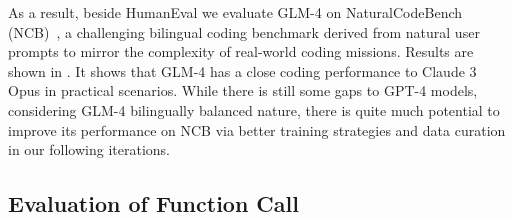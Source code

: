 \begin{table}[!ht]
    \centering
    \renewcommand{\arraystretch}{1.5}
    \caption{GLM-4 performance on NaturalCodeBench (NCB)~\cite{zhang2024naturalcodebench}, a benchmark with real coding prompts in two programming languages (Python and Java) for English and Chinese.}
    \label{tab:ncb}
\end{table}



As a result, beside HumanEval we evaluate GLM-4 on NaturalCodeBench (NCB)~\cite{zhang2024naturalcodebench}, a challenging bilingual coding benchmark derived from natural user prompts to mirror the complexity of real-world coding missions.
Results are shown in . 
It shows that GLM-4 has a close coding performance to Claude 3 Opus in practical scenarios.
While there is still some gaps to GPT-4 models, considering GLM-4 bilingually balanced nature, there is  quite much potential to improve its performance on NCB via better training strategies and data curation in our following iterations.






\subsection{Evaluation of Function Call}

